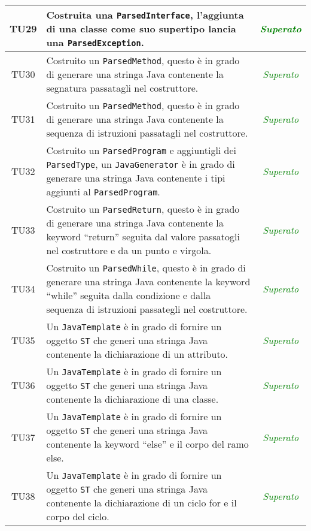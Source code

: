 \begin{longtable}{|c|>{}m{8cm}|c|}
\hypertarget{TU29}{TU29} & Costruita una \texttt{ParsedInterface}, l'aggiunta di una classe come suo supertipo lancia una \texttt{ParsedException}. & \textcolor{Green}{\textit{Superato}}\\ \hline
\hypertarget{TU30}{TU30} & Costruito un \texttt{ParsedMethod}, questo è in grado di generare una stringa Java contenente la segnatura passatagli nel costruttore. & \textcolor{Green}{\textit{Superato}}\\ \hline
\hypertarget{TU31}{TU31} & Costruito un \texttt{ParsedMethod}, questo è in grado di generare una stringa Java contenente la sequenza di istruzioni passatagli nel costruttore. & \textcolor{Green}{\textit{Superato}}\\ \hline
\hypertarget{TU32}{TU32} & Costruito un \texttt{ParsedProgram} e aggiuntigli dei \texttt{ParsedType}, un \texttt{JavaGenerator} è in grado di generare una stringa Java contenente i tipi aggiunti al \texttt{ParsedProgram}. & \textcolor{Green}{\textit{Superato}}\\ \hline
\hypertarget{TU33}{TU33} & Costruito un \texttt{ParsedReturn}, questo è in grado di generare una stringa Java contenente la keyword ``return'' seguita dal valore passatogli nel costruttore e da un punto e virgola. & \textcolor{Green}{\textit{Superato}}\\ \hline
\hypertarget{TU34}{TU34} & Costruito un \texttt{ParsedWhile}, questo è in grado di generare una stringa Java contenente la keyword ``while'' seguita dalla condizione e dalla sequenza di istruzioni passategli nel costruttore. & \textcolor{Green}{\textit{Superato}}\\ \hline
\hypertarget{TU35}{TU35} & Un \texttt{JavaTemplate} è in grado di fornire un oggetto \texttt{ST} che generi una stringa Java contenente la dichiarazione di un attributo. & \textcolor{Green}{\textit{Superato}}\\ \hline
\hypertarget{TU36}{TU36} & Un \texttt{JavaTemplate} è in grado di fornire un oggetto \texttt{ST} che generi una stringa Java contenente la dichiarazione di una classe. & \textcolor{Green}{\textit{Superato}}\\ \hline
\hypertarget{TU37}{TU37} & Un \texttt{JavaTemplate} è in grado di fornire un oggetto \texttt{ST} che generi una stringa Java contenente la keyword ``else'' e il corpo del ramo else. & \textcolor{Green}{\textit{Superato}}\\ \hline
\hypertarget{TU38}{TU38} & Un \texttt{JavaTemplate} è in grado di fornire un oggetto \texttt{ST} che generi una stringa Java contenente la dichiarazione di un ciclo for e il corpo del ciclo. & \textcolor{Green}{\textit{Superato}}\\ \hline

\end{longtable}
